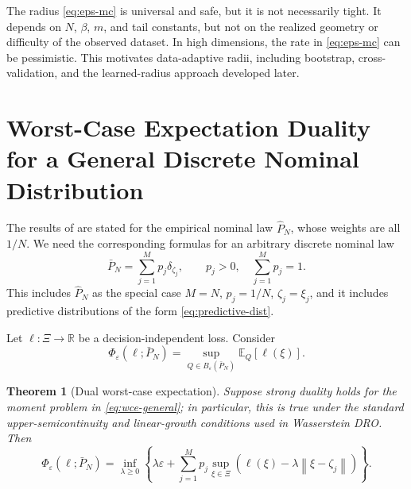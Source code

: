 \documentclass[11pt]{article}
\newtheorem{theorem}{Theorem}[section]
\newcommand{\R}{\mathbb{R}}
\newcommand{\E}{\mathbb{E}}
\newcommand{\XiSet}{\Xi}
\newcommand{\1}{\mathbf{1}}
\newcommand{\Phat}{\widehat P_N}
\newcommand{\Pbar}{\bar P_N}
\newcommand{\norm}[1]{\left\lVert #1\right\rVert}
\begin{document}
The radius \eqref{eq:eps-mc} is universal and safe, but it is not necessarily tight. It depends on $N$, $\beta$, $m$, and tail constants, but not on the realized geometry or difficulty of the observed dataset. In high dimensions, the rate in \eqref{eq:eps-mc} can be pessimistic. This motivates data-adaptive radii, including bootstrap, cross-validation, and the learned-radius approach developed later.

\section{Worst-Case Expectation Duality for a General Discrete Nominal Distribution}\label{sec:dual}

The results of \citet{esfahani2018data} are stated for the empirical nominal law $\Phat$, whose weights are all $1/N$. We need the corresponding formulas for an arbitrary discrete nominal law
\begin{equation}\label{eq:general-nominal}
    \Pbar=\sum_{j=1}^{M}p_j\delta_{\zeta_j},\qquad p_j>0,\quad \sum_{j=1}^M p_j=1.
\end{equation}
This includes $\Phat$ as the special case $M=N$, $p_j=1/N$, $\zeta_j=\xi_j$, and it includes predictive distributions of the form \eqref{eq:predictive-dist}.

Let $\ell:\XiSet\to\R$ be a decision-independent loss. Consider
\begin{equation}\label{eq:wce-general}
    \Phi_{\varepsilon}(\ell;\Pbar)=\sup_{Q\in B_\varepsilon(\Pbar)}\E_Q[\ell(\xi)].
\end{equation}

\begin{theorem}[Dual worst-case expectation]\label{thm:dual-general}
Suppose strong duality holds for the moment problem in \eqref{eq:wce-general}; in particular, this is true under the standard upper-semicontinuity and linear-growth conditions used in Wasserstein DRO. Then
\begin{equation}\label{eq:dual-general}
    \Phi_{\varepsilon}(\ell;\Pbar)
    =\inf_{\lambda\ge0}\left\{\lambda\varepsilon+\sum_{j=1}^Mp_j\sup_{\xi\in\XiSet}\left(\ell(\xi)-\lambda\norm{\xi-\zeta_j}\right)\right\}.
\end{equation}
\end{theorem}
\end{document}

